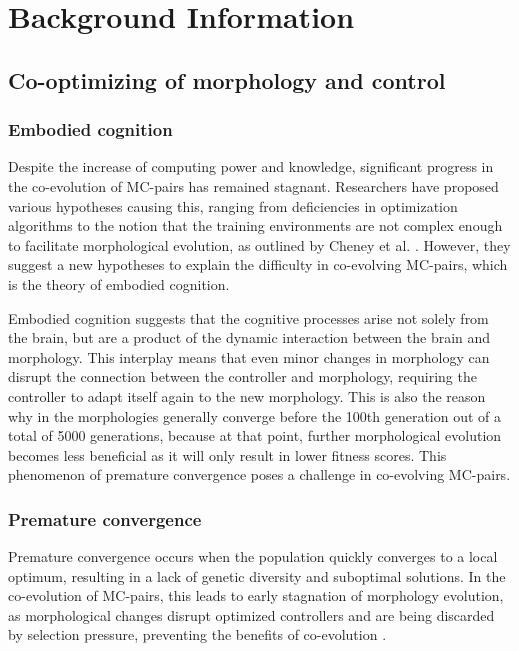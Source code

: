 \section{Background Information}

\subsection{Co-optimizing of morphology and control}
    \subsubsection{Embodied cognition}
        Despite the increase of computing power and knowledge, significant progress in the co-evolution of MC-pairs has remained stagnant. Researchers have proposed various hypotheses causing this, ranging from deficiencies in optimization algorithms to the notion that the training environments are not complex enough to facilitate morphological evolution, as outlined by Cheney et al. \cite{Cheney_2016}. However, they suggest a new hypotheses to explain the difficulty in co-evolving MC-pairs, which is the theory of embodied cognition. 

        Embodied cognition suggests that the cognitive processes arise not solely from the brain, but are a product of the dynamic interaction between the brain and morphology. This interplay means that even minor changes in morphology can disrupt the connection between the controller and morphology, requiring the controller to adapt itself again to the new morphology. This is also the reason why in \cite{Cheney_2016} the morphologies generally converge before the 100th generation out of a total of 5000 generations, because at that point, further morphological evolution becomes less beneficial as it will only result in lower fitness scores. This phenomenon of premature convergence poses a challenge in co-evolving MC-pairs.
 
    \subsubsection{Premature convergence}
        Premature convergence occurs when the population quickly converges to a local optimum, resulting in a lack of genetic diversity and suboptimal solutions. In the co-evolution of MC-pairs, this leads to early stagnation of morphology evolution, as morphological changes disrupt optimized controllers and are being discarded by selection pressure, preventing the benefits of co-evolution \cite{Luis_2024}.
        
